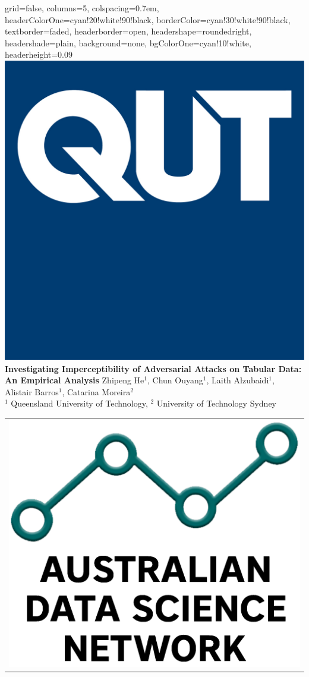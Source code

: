 \documentclass[portrait,a0paper]{baposter}
\begin{document}
\begin{poster}{
 grid=false,
 columns=5,
 colspacing=0.7em,
 headerColorOne=cyan!20!white!90!black,
 borderColor=cyan!30!white!90!black,
 textborder=faded,
 headerborder=open,
 headershape=roundedright,
 headershade=plain,
 background=none,
 bgColorOne=cyan!10!white,
 headerheight=0.09\textheight}
 {
      \includegraphics[width=0.08\linewidth]{qut-logo-og-1200.jpg}
 }
 {
 {\sc\huge\bf Investigating Imperceptibility of Adversarial Attacks on Tabular Data: An Empirical Analysis}}
 {Zhipeng He$^1$, Chun Ouyang$^1$, Laith Alzubaidi$^1$, Alistair Barros$^1$, Catarina Moreira$^2$ \\[0.2em]
 {$^1$ Queensland University of Technology, $^2$ University of Technology Sydney}}
 {
    \begin{tabular}{r}
        \includegraphics[width=0.08\linewidth]{ADSN-Logo-Black-Stacked.png}
    \end{tabular}
 }



\end{poster}
\end{document}
